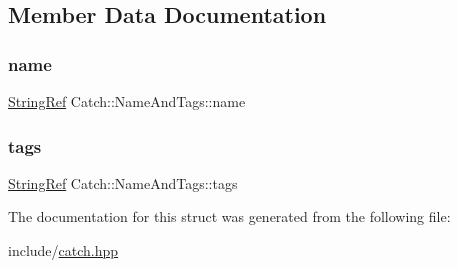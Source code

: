 \subsection{Member Data Documentation}
\mbox{\label{structCatch_1_1NameAndTags_a7cbea60e0cebfa622c667008eb011420}} 
\subsubsection{\texorpdfstring{name}{name}}
{\footnotesize\ttfamily \mbox{\hyperlink{classCatch_1_1StringRef}{String\+Ref}} Catch\+::\+Name\+And\+Tags\+::name}

\mbox{\label{structCatch_1_1NameAndTags_a74062ed1138834a348424eb7ed900c57}} 
\subsubsection{\texorpdfstring{tags}{tags}}
{\footnotesize\ttfamily \mbox{\hyperlink{classCatch_1_1StringRef}{String\+Ref}} Catch\+::\+Name\+And\+Tags\+::tags}



The documentation for this struct was generated from the following file\+:\begin{DoxyCompactItemize}
\item 
include/\mbox{\hyperlink{catch_8hpp}{catch.\+hpp}}\end{DoxyCompactItemize}
